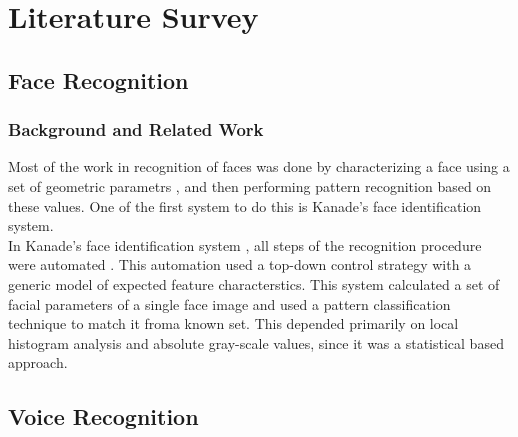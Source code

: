 
\chapter{Literature Survey}

\section{Face Recognition}

\subsection{Background and Related Work}
Most of the work in recognition of faces was done by characterizing a face using a set of geometric parametrs , and then performing pattern recognition based on these values. One of the first system to do this is Kanade's face identification system. \\
In Kanade's face identification system \cite{Kanade1973}, all steps of the recognition procedure were automated . This automation used a top-down control strategy with a generic model of expected feature characterstics. This system calculated a set of facial parameters of a single face image and used a pattern classification technique to match it froma known set. This depended primarily on local histogram analysis and absolute gray-scale values, since it was a statistical based approach. \\

\section{Voice Recognition}

